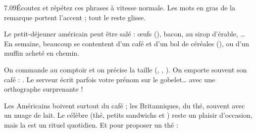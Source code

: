 \begin{phrases}{7.09}{Écoutez et répétez ces phrases à vitesse normale. Les mots en gras de la
remarque portent l'accent ; tout le reste glisse.}
\end{phrases}


\begin{paire}
\begin{culture}
Le petit-déjeuner américain peut être salé : œufs (), bacon,  au sirop
d'érable, … En semaine, beaucoup se contentent d'un café et d'un bol de céréales
(), ou d'un muffin acheté en chemin.
\end{culture}
\begin{culture}
On commande au comptoir et on précise la taille (, , ). On emporte
souvent son café : . Le serveur écrit parfois votre prénom sur le gobelet… avec une
orthographe surprenante !
\end{culture}
\end{paire}

\begin{culture}
Les Américains boivent surtout du café ; les Britanniques, du thé, souvent avec un nuage de lait.
Le célèbre  (thé, petits sandwichs et ) reste un plaisir d'occasion,
mais la  est un rituel quotidien. Et pour proposer un thé : 
\end{culture}


